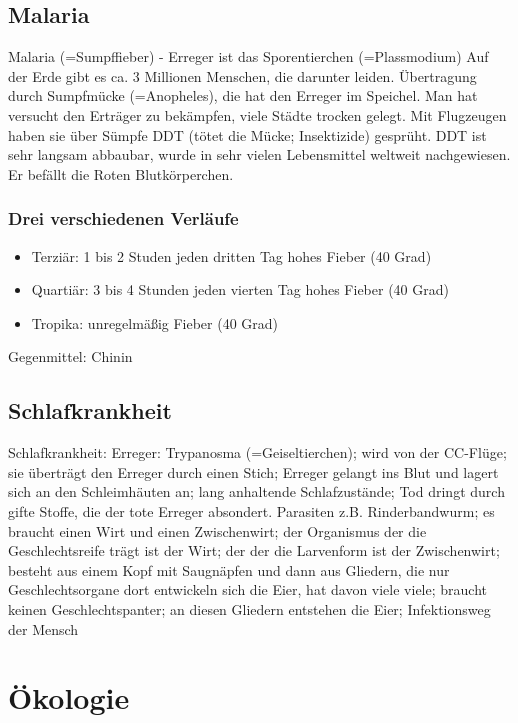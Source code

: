 \documentclass[a4paper]{article}
\begin{document}
\subsection{Malaria}
Malaria (=Sumpffieber) - Erreger ist das Sporentierchen (=Plassmodium)
Auf der Erde gibt es ca. 3 Millionen Menschen, die darunter leiden. Übertragung durch Sumpfmücke (=Anopheles), die hat den Erreger im Speichel. Man hat versucht den Erträger zu bekämpfen, viele Städte trocken gelegt. Mit Flugzeugen haben sie über Sümpfe DDT (tötet die Mücke; Insektizide) gesprüht. DDT ist sehr langsam abbaubar, wurde in sehr vielen Lebensmittel weltweit nachgewiesen. Er befällt die Roten Blutkörperchen.

\subsubsection{Drei verschiedenen Verläufe}

\begin{itemize}
\item Terziär: 1 bis 2 Studen jeden dritten Tag hohes Fieber (40 Grad)
\item Quartiär: 3 bis 4 Stunden jeden vierten Tag hohes Fieber (40 Grad)
\item Tropika: unregelmäßig Fieber (40 Grad)
\end{itemize}

Gegenmittel: Chinin

\subsection{Schlafkrankheit}
Schlafkrankheit: Erreger: Trypanosma (=Geiseltierchen); wird von der CC-Flüge; sie überträgt den Erreger durch einen Stich; Erreger gelangt ins Blut und lagert sich an den Schleimhäuten an; lang anhaltende Schlafzustände; Tod dringt durch gifte Stoffe, die der tote Erreger absondert.
\newline
Parasiten z.B. Rinderbandwurm; es braucht einen Wirt und einen Zwischenwirt; der Organismus der die Geschlechtsreife trägt ist der Wirt; der der die Larvenform ist der Zwischenwirt; besteht aus einem Kopf mit Saugnäpfen und dann aus Gliedern, die nur Geschlechtsorgane dort entwickeln sich die Eier, hat davon viele viele; braucht keinen Geschlechtspanter; an diesen Gliedern entstehen die Eier; Infektionsweg der Mensch 

\newpage

\section{Ökologie}
\end{document}
